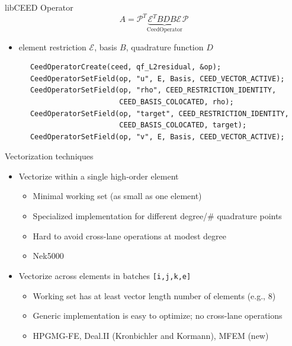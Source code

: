 \documentclass[aspectratio=169]{beamer}
\begin{document}
\begin{frame}[fragile]{libCEED Operator}
  \begin{equation*}
    A = \mathcal P^T \underbrace{\mathcal E^T B D B \mathcal E}_{\text{CeedOperator}} \mathcal P
  \end{equation*}
  \begin{itemize}
  \item element restriction $\mathcal E$, basis $B$, quadrature function $D$
  \end{itemize}
  \begin{minipage}{0.5\textwidth}
    \begin{verbatim}
      CeedOperatorCreate(ceed, qf_L2residual, &op);
      CeedOperatorSetField(op, "u", E, Basis, CEED_VECTOR_ACTIVE);
      CeedOperatorSetField(op, "rho", CEED_RESTRICTION_IDENTITY,
                           CEED_BASIS_COLOCATED, rho);
      CeedOperatorSetField(op, "target", CEED_RESTRICTION_IDENTITY,
                           CEED_BASIS_COLOCATED, target);
      CeedOperatorSetField(op, "v", E, Basis, CEED_VECTOR_ACTIVE);
    \end{verbatim}
  \end{minipage}
\end{frame}

\begin{frame}{Vectorization techniques}
  \begin{itemize}
  \item Vectorize within a single high-order element
    \begin{itemize}
    \item Minimal working set (as small as one element)
    \item Specialized implementation for different degree/\# quadrature points
    \item Hard to avoid cross-lane operations at modest degree
    \item Nek5000
    \end{itemize}
  \item Vectorize across elements in batches \texttt{[i,j,k,e]}
    \begin{itemize}
    \item Working set has at least vector length number of elements (e.g., 8)
    \item Generic implementation is easy to optimize; no cross-lane operations
    \item HPGMG-FE, Deal.II (Kronbichler and Kormann), MFEM (new)
    \end{itemize}
  \end{itemize}
\end{frame}
\end{document}
